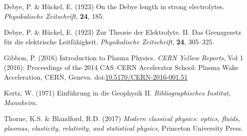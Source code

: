 \documentclass[
  a4paper,
  DIV=11]{scrreprt}
\newlength{\cslhangindent}
\newlength{\cslentryspacingunit} %
\newenvironment{CSLReferences}[2] %
 {%
  \setlength{\parindent}{0pt}
  \ifodd #1
  \let\oldpar\par
  \def\par{\hangindent=\cslhangindent\oldpar}
  \fi
  \setlength{\parskip}{#2\cslentryspacingunit}
 }%
 {}
\begin{document}
\hypertarget{refs}{}
\begin{CSLReferences}{1}{0}
\leavevmode{}%
Debye, P. \& Hückel, E. (1923) On the Debye length in strong
electrolytes. \emph{Physikalische Zeitschrift}, \textbf{24}, 185.

\leavevmode{}%
Debye, P. \& Hückel, E. (1923) {Zur Theorie der Elektrolyte. II. Das
Grenzgesetz f{ü}r die elektrische Leitf{ä}higkeit}. \emph{Physikalische
Zeitschrift}, \textbf{24}, 305--325.

\leavevmode{}%
Gibbon, P. (2016) Introduction to Plasma Physics. \emph{CERN Yellow
Reports}, Vol 1 (2016): Proceedings of the 2014 CAS--CERN Accelerator
School: Plasma Wake Acceleration, CERN, Geneva.
doi:\href{https://doi.org/10.5170/CERN-2016-001.51}{10.5170/CERN-2016-001.51}

\leavevmode{}%
Kertz, W. (1971) {Einf{ü}hrung in die Geophysik II}.
\emph{Bibliographisches Institut, Mannheim}.

\leavevmode{}%
Thorne, K.S. \& Blandford, R.D. (2017) \emph{Modern classical physics:
optics, fluids, plasmas, elasticity, relativity, and statistical
physics}, Princeton University Press.

\end{CSLReferences}
\end{document}
